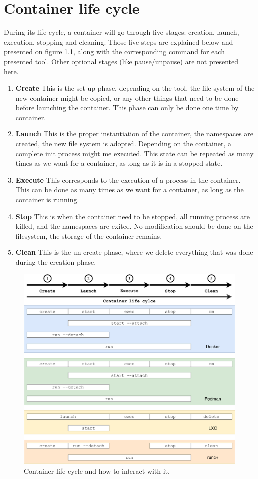 \appendix
\chapter{Container life cycle}
During its life cycle, a container will go through five stages: creation, launch, execution, stopping and cleaning.  Those five steps are explained below and presented on figure \ref{fig:container-life-cycle}, along with the corresponding command for each presented tool.  Other optional stages (like pause/unpause) are not presented here.
\begin{enumerate}
\item\textbf{Create} This is the set-up phase, depending on the tool, the file system of the new container might be copied, or any other things that need to be done before launching the container.  This phase can only be done one time by container.
\item\textbf{Launch} This is the proper instantiation of the container, the namespaces are created, the new file system is adopted.  Depending on the container, a complete init process might me executed.  This state can be repeated as many times as we want for a container, as long as it is in a stopped state.
\item\textbf{Execute} This corresponds to the execution of a process in the container.  This can be done as many times as we want for a container, as long as the container is running.
\item\textbf{Stop} This is when the container need to be stopped, all running process are killed, and the namespaces are exited.  No modification should be done on the filesystem, the storage of the container remains.
\item\textbf{Clean} This is the un-create phase, where we delete everything that was done during the creation phase.
\end{enumerate}
\begin{figure}[!h]
  \begin{center}
    \includegraphics[width=\linewidth]{images/Container-life-cycle.pdf}
    \caption{Container life cycle and how to interact with it.}
    \label{fig:container-life-cycle}
  \end{center}
\end{figure}
